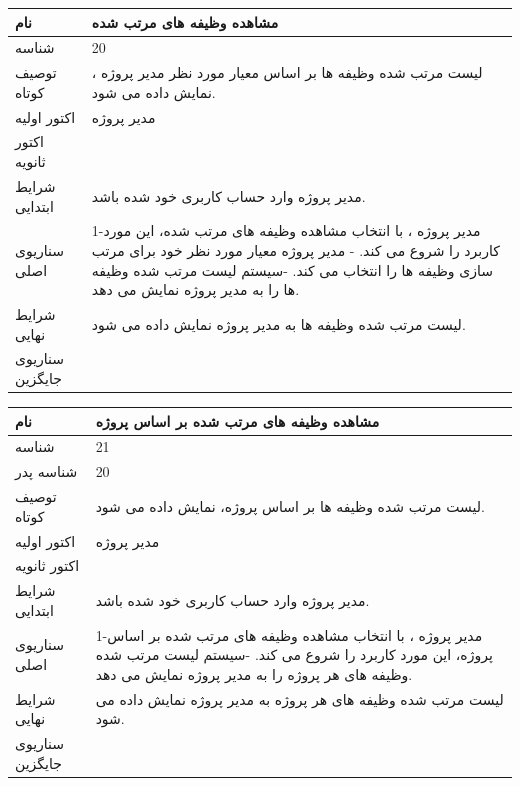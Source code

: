 \documentclass{article}
\begin{document}
\vspace{2cm}

\begin{tabular}{|p{2cm}|p{10cm}|}
\hline
نام
&
مشاهده وظیفه های مرتب شده
\\
\hline
شناسه
&
20
\\
\hline
توصیف کوتاه
&
لیست مرتب شده وظیفه ها بر اساس معیار مورد نظر مدیر پروژه ، نمایش داده می شود.
\\
\hline
اکتور اولیه
&
مدیر پروژه
\\
\hline
اکتور ثانویه
&

\\
\hline
شرایط ابتدایی
&
مدیر پروژه وارد حساب کاربری خود شده باشد. 
\\
\hline
سناریوی اصلی
&
1-مدیر پروژه ، با انتخاب مشاهده وظیفه های مرتب شده، این مورد کاربرد را شروع می کند.
\newline
2- مدیر پروژه معیار مورد نظر خود برای مرتب سازی وظیفه ها را انتخاب می کند. 
\newline
3-سیستم لیست مرتب شده وظیفه ها را به مدیر پروژه نمایش می دهد.
\\
\hline
شرایط نهایی
&
لیست مرتب شده وظیفه ها به مدیر پروژه نمایش داده می شود.
\\
\hline
سناریوی جایگزین
&

\\
\hline
\end{tabular}

\vspace{2cm}

\begin{tabular}{|p{2cm}|p{10cm}|}
\hline
نام
&
مشاهده وظیفه های مرتب شده بر اساس پروژه
\\
\hline
شناسه
&
21
\\
\hline
شناسه پدر
&
20
\\
\hline
توصیف کوتاه  
&
لیست مرتب شده وظیفه ها بر اساس پروژه، نمایش داده می شود.
\\
\hline
اکتور اولیه
&
مدیر پروژه
\\
\hline
اکتور ثانویه
&

\\
\hline
شرایط ابتدایی
&
مدیر پروژه وارد حساب کاربری خود شده باشد. 
\\
\hline
سناریوی اصلی
&
1-مدیر پروژه ، با انتخاب مشاهده وظیفه های مرتب شده بر اساس پروژه، این مورد کاربرد را شروع می کند.
\newline
2-سیستم لیست مرتب شده وظیفه های هر پروژه  را به مدیر پروژه نمایش می دهد.
\\
\hline
شرایط نهایی
&
لیست مرتب شده وظیفه های هر پروژه به مدیر پروژه نمایش داده می شود.
\\
\hline
سناریوی جایگزین
&

\\
\hline
\end{tabular}
\end{document}
